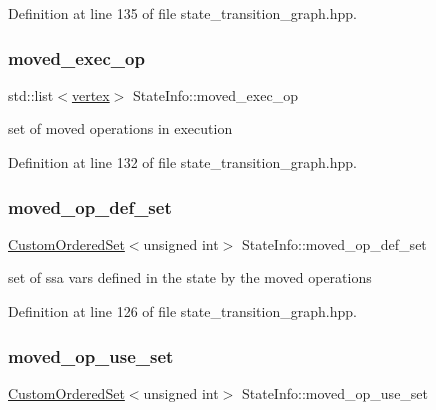 Definition at line 135 of file state\+\_\+transition\+\_\+graph.\+hpp.

\mbox{\label{structStateInfo_a41fc3ae3e3b718e7081f254e2b2a9dd0}} 
\subsubsection{\texorpdfstring{moved\+\_\+exec\+\_\+op}{moved\_exec\_op}}
{\footnotesize\ttfamily std\+::list$<$\hyperlink{graph_8hpp_abefdcf0544e601805af44eca032cca14}{vertex}$>$ State\+Info\+::moved\+\_\+exec\+\_\+op}



set of moved operations in execution 



Definition at line 132 of file state\+\_\+transition\+\_\+graph.\+hpp.

\mbox{\label{structStateInfo_a19945c7bebd3e104f6003e24e224856c}} 
\subsubsection{\texorpdfstring{moved\+\_\+op\+\_\+def\+\_\+set}{moved\_op\_def\_set}}
{\footnotesize\ttfamily \hyperlink{classCustomOrderedSet}{Custom\+Ordered\+Set}$<$unsigned int$>$ State\+Info\+::moved\+\_\+op\+\_\+def\+\_\+set}



set of ssa vars defined in the state by the moved operations 



Definition at line 126 of file state\+\_\+transition\+\_\+graph.\+hpp.

\mbox{\label{structStateInfo_a8a506af4e9a00aa0d390b384f8ad60b2}} 
\subsubsection{\texorpdfstring{moved\+\_\+op\+\_\+use\+\_\+set}{moved\_op\_use\_set}}
{\footnotesize\ttfamily \hyperlink{classCustomOrderedSet}{Custom\+Ordered\+Set}$<$unsigned int$>$ State\+Info\+::moved\+\_\+op\+\_\+use\+\_\+set}



